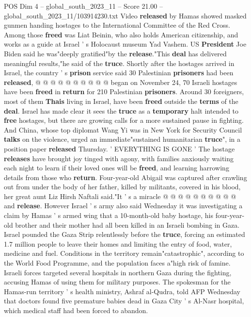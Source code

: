 \begin{textsample}{POS Dim 4 – global\_south\_2023\_11 – Score 21.00 – global\_south\_2023\_11/103914230.txt}
Video \textbf{released} by Hamas showed masked gunmen handing hostages to the International Committee of the Red Cross.
Among those \textbf{freed} was Liat Beinin, who also holds American citizenship, and works as a guide at Israel ' s Holocaust museum Yad Vashem.
US \textbf{President} Joe Biden said he was"deeply gratified"by the \textbf{release}."This \textbf{deal} has delivered meaningful results,"he said of the \textbf{truce}.
Shortly after the hostages arrived in Israel, the country ' s \textbf{prison} service said 30 Palestinian \textbf{prisoners} had been \textbf{released}, @ @ @ @ @ @ @ @ @ @ began on November 24, 70 Israeli hostages have been \textbf{freed} in \textbf{return} for 210 Palestinian \textbf{prisoners}.
Around 30 foreigners, most of them \textbf{Thais} living in Israel, have been \textbf{freed} outside the \textbf{terms} of the \textbf{deal}.
Israel has made clear it sees the \textbf{truce} as a \textbf{temporary} halt intended to \textbf{free} hostages, but there are growing calls for a more sustained pause in fighting.
And China, whose top diplomat Wang Yi was in New York for Security Council \textbf{talks} on the violence, urged an immediate"sustained humanitarian \textbf{truce}", in a position paper \textbf{released} Thursday. ' EVERYTHING IS GONE ' The hostage \textbf{releases} have brought joy tinged with agony, with families anxiously waiting each night to learn if their loved ones will be \textbf{freed}, and learning harrowing details from those who \textbf{return}.
Four-year-old Abigail was captured after crawling out from under the body of her father, killed by militants, covered in his blood, her great aunt Liz Hirsh Naftali said."It ' s a miracle @ @ @ @ @ @ @ @ @ @ and \textbf{release}.
However Israel ' s army also said Wednesday it was investigating a claim by Hamas ' s armed wing that a 10-month-old baby hostage, his four-year-old brother and their mother had all been killed in an Israeli bombing in Gaza.
Israel pounded the Gaza Strip relentlessly before the \textbf{truce}, forcing an estimated 1.7 million people to leave their homes and limiting the entry of food, water, medicine and fuel.
Conditions in the territory remain"catastrophic", according to the World Food Programme, and the population faces a"high risk of famine.
Israeli forces targeted several hospitals in northern Gaza during the fighting, accusing Hamas of using them for military purposes.
The spokesman for the Hamas-run territory ' s health ministry, Ashraf al-Qudra, told AFP Wednesday that doctors found five premature babies dead in Gaza City ' s Al-Nasr hospital, which medical staff had been forced to abandon.

\end{textsample}
